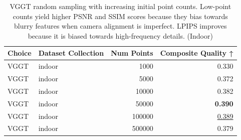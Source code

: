 \begin{table}[H]
\caption{\ifdefined\customcaption \customcaption \else VGGT random sampling with increasing initial point counts. Low-point counts yield higher PSNR and SSIM scores because they bias towards blurry features when camera alignment is imperfect. LPIPS improves because it is biased towards high-frequency details. (Indoor) \fi}
\label{tab:03_sampling_mode_single_indoor}
\centering
\scriptsize
\begin{tabular}{llrr}
\toprule
Choice & Dataset Collection & Num Points & Composite Quality ↑ \\
\midrule
VGGT & indoor & 1000 & 0.330 \\
VGGT & indoor & 5000 & 0.372 \\
VGGT & indoor & 10000 & 0.382 \\
VGGT & indoor & 50000 & \textbf{0.390} \\
VGGT & indoor & 100000 & \underline{0.389} \\
VGGT & indoor & 500000 & 0.379 \\
\bottomrule
\end{tabular}
\end{table}